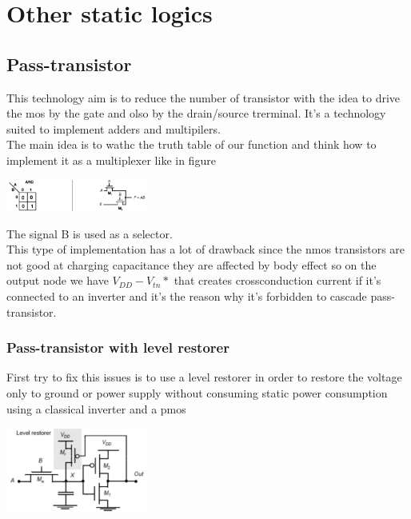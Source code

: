 \chapter{Other static logics}
\section{Pass-transistor}
This technology aim is to reduce the number of transistor with the idea to drive the mos by the gate and olso by the drain/source trerminal. It's a technology suited to implement adders and multipilers.\\
The main idea is to wathc the truth table of our function and think how to implement it as a multiplexer like in figure 

\centering
\includegraphics[width=0.35\textwidth]{C8_1.png}\\
\raggedright
 
The signal B is used as a selector.\\
This type of implementation has a lot of drawback since the nmos transistors are not good at charging capacitance they are affected by body effect so on the output node we have $V_{DD}-V_{tn}*$ that creates crossconduction current if it's connected to an inverter and it's the reason why it's forbidden to cascade pass-transistor.\\
\subsection{Pass-transistor with level restorer}

First try to fix this issues is to use a level restorer in order to restore the voltage only to ground or power supply without consuming static power consumption using a classical inverter and a pmos 

\centering
\includegraphics[width=0.35\textwidth]{C8_2.png}\\
\raggedright

